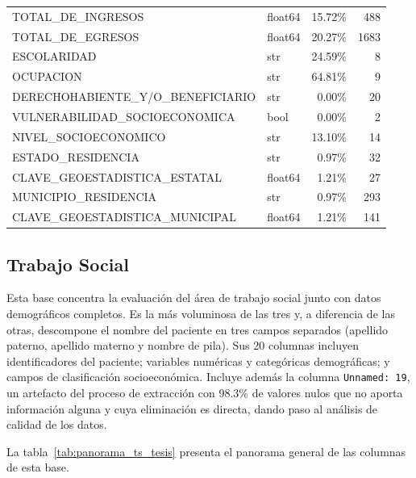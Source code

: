 \begin{table}[H]
{\begin{tabular}{>{\raggedright\arraybackslash}p{8.5cm}>{\raggedright\arraybackslash}p{2.5cm}rr}
TOTAL\_DE\_INGRESOS               & float64 & 15.72\% & 488  \\
TOTAL\_DE\_EGRESOS                & float64 & 20.27\% & 1683 \\
ESCOLARIDAD                       & str     & 24.59\% & 8    \\
OCUPACION                         & str     & 64.81\% & 9    \\
DERECHOHABIENTE\_Y/O\_BENEFICIARIO & str    & 0.00\%  & 20   \\
VULNERABILIDAD\_SOCIOECONOMICA    & bool    & 0.00\%  & 2    \\
NIVEL\_SOCIOECONOMICO             & str     & 13.10\% & 14   \\
ESTADO\_RESIDENCIA                & str     & 0.97\%  & 32   \\
CLAVE\_GEOESTADISTICA\_ESTATAL    & float64 & 1.21\%  & 27   \\
MUNICIPIO\_RESIDENCIA             & str     & 0.97\%  & 293  \\
CLAVE\_GEOESTADISTICA\_MUNICIPAL  & float64 & 1.21\%  & 141  \\
\bottomrule
\end{tabular}}
\end{table}


\subsection{Trabajo Social}

Esta base concentra la evaluación del área de trabajo social junto con datos demográficos completos. Es la más voluminosa de las tres y, a diferencia de las otras, descompone el nombre del paciente en tres campos separados (apellido paterno, apellido materno y nombre de pila). Sus 20 columnas incluyen identificadores del paciente; variables numéricas y categóricas demográficas; y campos de clasificación socioeconómica. Incluye además la columna \texttt{Unnamed: 19}, un artefacto del proceso de extracción con 98.3\% de valores nulos que no aporta información alguna y cuya eliminación es directa, dando paso al análisis de calidad de los datos.

La tabla~\ref{tab:panorama_ts_tesis} presenta el panorama general de las columnas de esta base.


